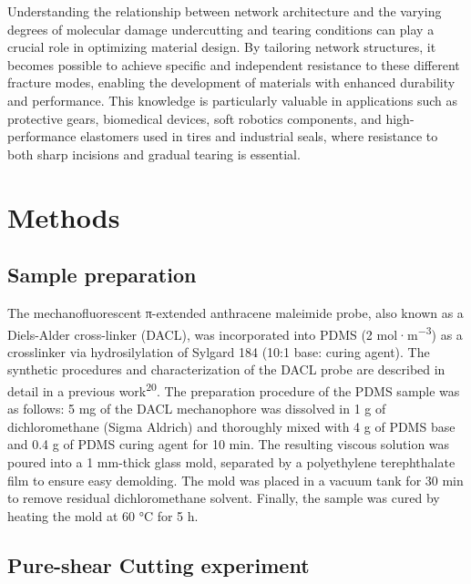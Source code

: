 \documentclass{article}
\begin{document}
Understanding the relationship between network architecture and the varying degrees of molecular damage undercutting and tearing conditions can play a crucial role in optimizing material design. By tailoring network structures, it becomes possible to achieve specific and independent resistance to these different fracture modes, enabling the development of materials with enhanced durability and performance. This knowledge is particularly valuable in applications such as protective gears, biomedical devices, soft robotics components, and high-performance elastomers used in tires and industrial seals, where resistance to both sharp incisions and gradual tearing is essential.

\section*{Methods}

\subsection*{Sample preparation}

The mechanofluorescent π-extended anthracene maleimide probe, also known as a Diels-Alder cross-linker (DACL), was incorporated into PDMS (2 mol·m\textsuperscript{−3}) as a crosslinker via hydrosilylation of Sylgard 184 (10:1 base: curing agent). The synthetic procedures and characterization of the DACL probe are described in detail in a previous work\textsuperscript{20}. The preparation procedure of the PDMS sample was as follows: 5 mg of the DACL mechanophore was dissolved in 1 g of dichloromethane (Sigma Aldrich) and thoroughly mixed with 4 g of PDMS base and 0.4 g of PDMS curing agent for 10 min. The resulting viscous solution was poured into a 1 mm-thick glass mold, separated by a polyethylene terephthalate film to ensure easy demolding. The mold was placed in a vacuum tank for 30 min to remove residual dichloromethane solvent. Finally, the sample was cured by heating the mold at 60 °C for 5 h.

\subsection*{Pure-shear Cutting experiment}
\end{document}

